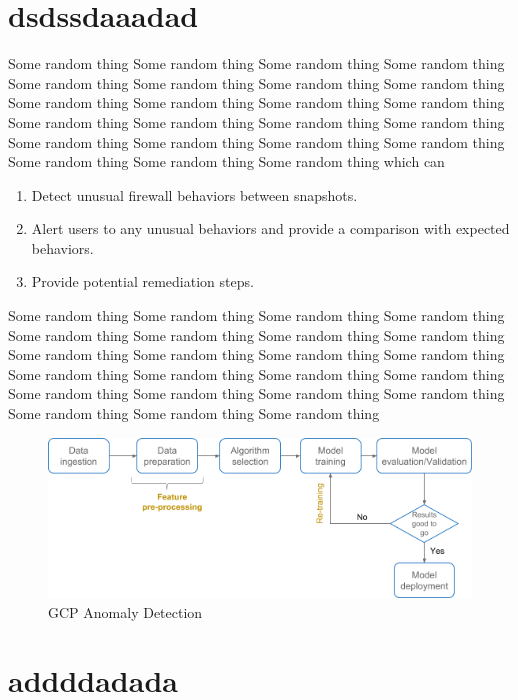 \section{dsdssdaaadad }
Some random thing Some random thing Some random thing Some random thing Some random thing Some random thing Some random thing Some random thing Some random thing Some random thing Some random thing Some random thing Some random thing Some random thing Some random thing Some random thing Some random thing Some random thing Some random thing Some random thing Some random thing Some random thing Some random thing  \cite{google31} which can
\begin{enumerate}
    \item Detect unusual firewall behaviors between snapshots.
    \item Alert users to any unusual behaviors and provide a comparison with expected behaviors.
    \item Provide potential remediation steps.
\end{enumerate}

Some random thing Some random thing Some random thing Some random thing Some random thing Some random thing Some random thing Some random thing Some random thing Some random thing Some random thing Some random thing Some random thing Some random thing Some random thing Some random thing Some random thing Some random thing Some random thing Some random thing Some random thing Some random thing Some random thing   \newline
\par
\begin{figure}[h]
\begin{center}
    \includegraphics[width=14cm]{texfiles/images/security1.png}
\caption{ GCP Anomaly Detection \protect\cite{Identify70:online}}
\label{fig:gcp_ano}
\end{center}
   
\end{figure}
\section{addddadada}

